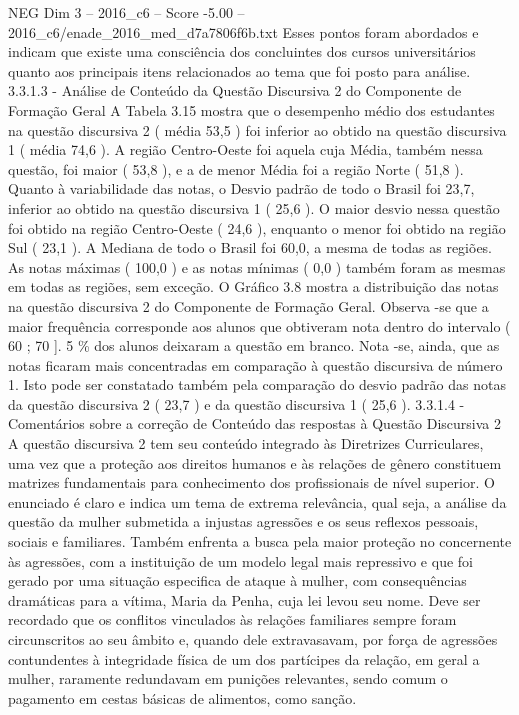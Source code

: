 \begin{textsample}{NEG Dim 3 – 2016\_c6 – Score -5.00 – 2016\_c6/enade\_2016\_med\_d7a7806f6b.txt}
Esses pontos foram abordados e indicam que existe uma consciência dos concluintes dos cursos universitários quanto aos principais itens relacionados ao tema que foi posto para análise. 3.3.1.3 - Análise de Conteúdo da Questão Discursiva 2 do Componente de Formação Geral A Tabela 3.15 mostra que o desempenho médio dos estudantes na questão discursiva 2 ( média 53,5 ) foi inferior ao obtido na questão discursiva 1 ( média 74,6 ).
A região Centro-Oeste foi aquela cuja Média, também nessa questão, foi maior ( 53,8 ), e a de menor Média foi a região Norte ( 51,8 ).
Quanto à variabilidade das notas, o Desvio padrão de todo o Brasil foi 23,7, inferior ao obtido na questão discursiva 1 ( 25,6 ).
O maior desvio nessa questão foi obtido na região Centro-Oeste ( 24,6 ), enquanto o menor foi obtido na região Sul ( 23,1 ).
A Mediana de todo o Brasil foi 60,0, a mesma de todas as regiões.
As notas máximas ( 100,0 ) e as notas mínimas ( 0,0 ) também foram as mesmas em todas as regiões, sem exceção.
O Gráfico 3.8 mostra a distribuição das notas na questão discursiva 2 do Componente de Formação Geral.
Observa -se que a maior frequência corresponde aos alunos que obtiveram nota dentro do intervalo ( 60 ; 70 ]. 5 \% dos alunos deixaram a questão em branco.
Nota -se, ainda, que as notas ficaram mais concentradas em comparação à questão discursiva de número 1.
Isto pode ser constatado também pela comparação do desvio padrão das notas da questão discursiva 2 ( 23,7 ) e da questão discursiva 1 ( 25,6 ). 3.3.1.4 - Comentários sobre a correção de Conteúdo das respostas à Questão Discursiva 2 A questão discursiva 2 tem seu conteúdo integrado às Diretrizes Curriculares, uma vez que a proteção aos direitos humanos e às relações de gênero constituem matrizes fundamentais para conhecimento dos profissionais de nível superior.
O enunciado é claro e indica um tema de extrema relevância, qual seja, a análise da questão da mulher submetida a injustas agressões e os seus reflexos pessoais, sociais e familiares.
Também enfrenta a busca pela maior proteção no concernente às agressões, com a instituição de um modelo legal mais repressivo e que foi gerado por uma situação especifica de ataque à mulher, com consequências dramáticas para a vítima, Maria da Penha, cuja lei levou seu nome.
Deve ser recordado que os conflitos vinculados às relações familiares sempre foram circunscritos ao seu âmbito e, quando dele extravasavam, por força de agressões contundentes à integridade física de um dos partícipes da relação, em geral a mulher, raramente redundavam em punições relevantes, sendo comum o pagamento em cestas básicas de alimentos, como sanção.

\end{textsample}
